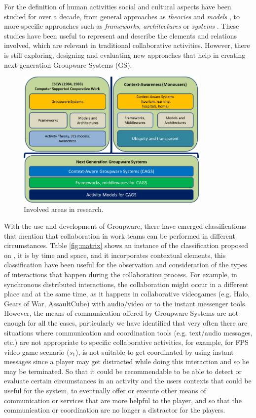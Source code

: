 \documentclass{./sty/llncs}
\begin{document}
For the definition of human activities social and cultural aspects have been studied for over a decade, from general approaches as \textit{theories} \cite{Engestrom87} and \textit{models} \cite{Mezura03,Fitzpatrick03,Martel06}, to more specific approaches such as \textit{frameworks}, \textit{architectures} or \textit{systems} \cite{Preguica05,Guicking06}. These studies have been useful to represent and describe the elements and relations involved, which are relevant in traditional collaborative activities. However, there is still exploring, designing and evaluating new approaches that help in creating next-generation Groupware Systems (GS).

\begin{figure}[ht!]
	\centering
	\includegraphics[width=9.4cm]{images/contextoInvestigacion.png}
	\caption{Involved areas in research.} %
	\label{fig:contextoInvestigacion}
\end{figure}

With the use and development of Groupware, there have emerged classifications that mention that collaboration in work teams can be performed in different circumstances. Table \ref{fig:matrix} shows an instance of the classification proposed on \cite{Johansen88}, it is by time and space, and it incorporates contextual elements, this classification have been useful for the observation and consideration of the types of interactions that happen during the collaboration process. For example, in synchronous distributed interactions, the collaboration might occur in a different place and at the same time, as it happens in collaborative videogames (e.g. Halo, Gears of War, AssaultCube) with audio/video or to the instant messenger tools. However, the means of communication offered by Groupware Systems are not enough for all the cases, particularly we have identified that very often there are situations where communication and coordination tools (e.g. text/audio messages, etc.) are not appropriate to specific collaborative activities, for example, for FPS video game scenario ($s_1$), is not suitable to get coordinated by using instant messages since a player may get distracted while doing this interaction and so he may be terminated. So that it could be recommendable to be able to detect or evaluate certain circumstances in an activity and the users contexts that could be useful for the system, to eventually offer or execute other means of communication or services that are more helpful to the player, and so that the communication or coordination are no longer a distractor for the players.
\end{document}
